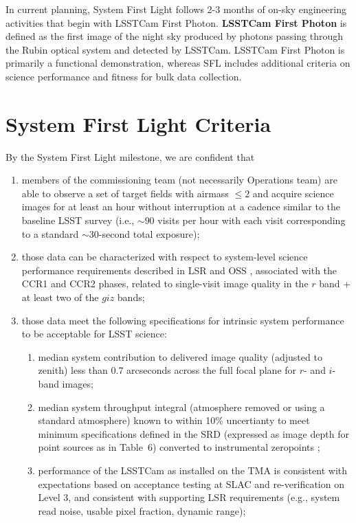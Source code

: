 \documentclass[SE,authoryear,toc]{lsstdoc}
\begin{document}
In current planning, System First Light follows 2-3 months of on-sky engineering activities that begin with LSSTCam First Photon.
\textbf {LSSTCam First Photon} is defined as the first image of the night sky produced by photons passing through the Rubin optical system and detected by LSSTCam.
LSSTCam First Photon is primarily a functional demonstration, whereas SFL includes additional criteria on science performance and fitness for bulk data collection.

\section{System First Light Criteria}
\label{criteria}

By the System First Light milestone, we are confident that

\begin{enumerate}
  \item members of the commissioning team (not necessarily Operations team) are able to observe a set of target fields with airmass $\leq 2$ and acquire science images for at least an hour without interruption at a cadence similar to the baseline LSST survey (i.e., $\sim90$ visits per hour with each visit corresponding to a standard $\sim30$-second total exposure);
  \item those data can be characterized with respect to system-level science performance requirements described in LSR  and OSS , associated with the CCR1 and CCR2 phases, related to single-visit image quality in the $r$ band + at least two of the $giz$ bands;
  \item those data meet the following specifications for intrinsic system performance to be acceptable for LSST science:
  \begin{enumerate}
    \item median system contribution to delivered image quality (adjusted to zenith) less than 0.7 arcseconds across the full focal plane for $r$- and $i$-band images;
    \item median system throughput integral (atmosphere removed or using a standard atmosphere) known to within 10\% uncertianty to meet minimum specifications defined in the SRD (expressed as image depth for point sources as in Table~6) converted to instrumental zeropoints ;
    \item performance of the LSSTCam as installed on the TMA is consistent with expectations based on acceptance testing at SLAC and re-verification on Level 3, and consistent with supporting LSR requirements (e.g., system read noise, usable pixel fraction, dynamic range);

\end{enumerate}
\end{enumerate}
\end{document}
